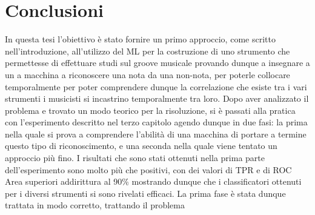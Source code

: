 \chapter*{Conclusioni}
In questa tesi l'obiettivo è stato fornire un primo approccio, come scritto nell'introduzione, all'utilizzo del ML per la costruzione di uno strumento che permettesse di effettuare studi sul groove musicale provando dunque a insegnare a un a macchina a riconoscere una nota da una non-nota, per poterle collocare temporalmente per poter comprendere dunque la correlazione che esiste tra i vari strumenti i musicisti si incastrino temporalmente tra loro. Dopo aver analizzato il problema e trovato un modo teorico per la risoluzione, si è passati alla pratica con l'esperimento descritto nel terzo capitolo agendo dunque in due fasi: la prima nella quale si prova a comprendere l'abilità di una macchina di portare a termine questo tipo di riconoscimento, e una seconda nella quale viene tentato un approccio più fino. I risultati che sono stati ottenuti nella prima parte dell'esperimento sono molto più che positivi, con dei valori di TPR e di ROC Area superiori addirittura al 90\% mostrando dunque che i classificatori ottenuti per i diversi strumenti si sono rivelati efficaci. La prima fase è stata dunque trattata in modo corretto, trattando il problema 